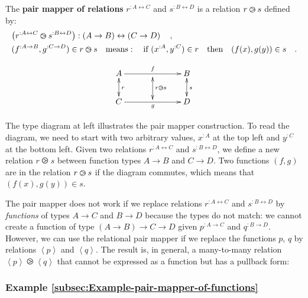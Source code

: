 The \textbf{pair mapper of relations} $r^{:A\leftrightarrow C}$ and
$s^{:B\leftrightarrow D}$ is a relation $r\varogreaterthan s$ defined
by:
\begin{align*}
 & \big(r^{:A\leftrightarrow C}\varogreaterthan s^{:B\leftrightarrow D}\big):\left(A\rightarrow B\right)\leftrightarrow\left(C\rightarrow D\right)\quad,\\
 & (f^{:A\rightarrow B},g^{:C\rightarrow D})\in r\varogreaterthan s\quad\text{means}:\quad\text{if }(x^{:A},y^{:C})\in r\quad\text{then}\quad(f(x),g(y))\in s\quad.
\end{align*}

\begin{wrapfigure}{l}{0.24\columnwidth}%
\vspace{-2.8\baselineskip}
\[
\xymatrix{\xyScaleY{1.8pc}\xyScaleX{2.6pc}A\ar@{<->}[d]\sp(0.5){r}\ar[rr]\sp(0.5){f} & \ar@{<->}[d(0.9)]\sp(0.55){r\varogreaterthan s} & B\ar@{<->}[d]\sp(0.5){s}\\
C\ar[rr]\sb(0.5){g} &  & D
}
\]

\vspace{-2.5\baselineskip}
\end{wrapfigure}%

\noindent The type diagram at left illustrates the pair mapper construction.
To read the diagram, we need to start with two arbitrary values, $x^{:A}$
at the top left and $y^{:C}$ at the bottom left. Given two relations
$r^{:A\leftrightarrow C}$ and $s^{:B\leftrightarrow D}$, we define
a new relation $r\ogreaterthan s$ between function types $A\rightarrow B$
and $C\rightarrow D$. Two functions $\left(f,g\right)$ are in the
relation $r\varogreaterthan s$ if the diagram commutes, which means
that $(f(x),g(y))\in s$.

The pair mapper does not work if we replace relations $r^{:A\leftrightarrow C}$
and $s^{:B\leftrightarrow D}$ by \emph{functions} of types $A\rightarrow C$
and $B\rightarrow D$ because the types do not match: we cannot create
a function of type $\left(A\rightarrow B\right)\rightarrow C\rightarrow D$
given $p^{:A\rightarrow C}$ and $q^{:B\rightarrow D}$. However,
we can use the relational pair mapper if we replace the functions
$p$, $q$ by relations $\left<p\right>$ and $\left<q\right>$. The
result is, in general, a many-to-many relation $\left<p\right>\ogreaterthan\left<q\right>$
that cannot be expressed as a function but has a pullback form:

\subsubsection{Example \label{subsec:Example-pair-mapper-of-functions}\ref{subsec:Example-pair-mapper-of-functions}}

